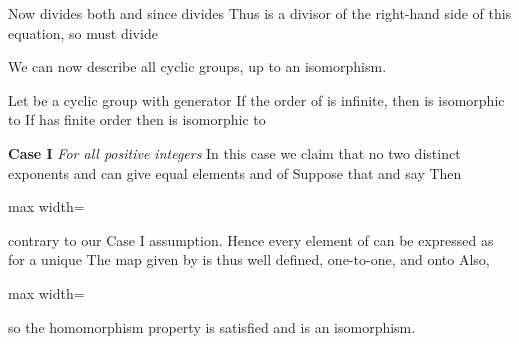 \documentclass[11pt,oneside]{article}
\begin{document}
\begin{BookBody}
\noindent Now  divides both  and  since  divides  Thus  is a divisor of the right-hand side of this equation, so  must divide 


\noindent We can now describe all cyclic groups, up to an isomorphism.

 Let  be a cyclic group with generator  If the order of  is infinite, then  is isomorphic to  If  has finite order  then  is isomorphic to 

 \textbf{Case I} \textit{For all positive integers}   In this case we claim that no two distinct exponents  and  can give equal elements  and  of  Suppose that  and say  Then

\begin{center}\begin{adjustbox}{max width=\linewidth}\end{adjustbox}\end{center}

contrary to our Case I assumption. Hence every element of  can be expressed as  for a unique  The map  given by  is thus well defined, one-to-one, and onto  Also,

\begin{center}\begin{adjustbox}{max width=\linewidth}\end{adjustbox}\end{center}

so the homomorphism property is satisfied and \BookInline{\phi } is an isomorphism.

\end{BookBody}
\end{document}
